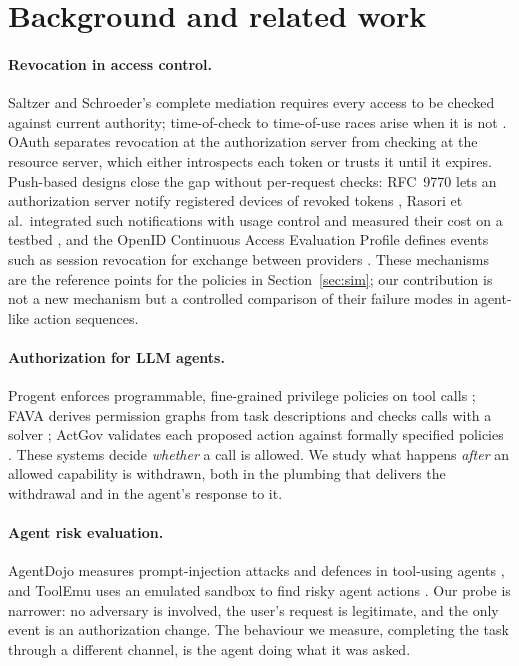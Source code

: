 \documentclass[11pt,a4paper]{article}
\begin{document}
\section{Background and related work}

\paragraph{Revocation in access control.}
Saltzer and Schroeder's complete mediation \citep{saltzer1975protection} requires every access to be checked
against current authority; time-of-check to time-of-use races arise when it is not \citep{bishop1996race}.
OAuth separates revocation at the authorization server \citep{rfc7009} from checking at the resource server,
which either introspects each token \citep{rfc7662} or trusts it until it expires. Push-based designs close the
gap without per-request checks: RFC~9770 lets an authorization server notify registered devices of revoked
tokens \citep{rfc9770}, Rasori et al.\ integrated such notifications with usage control and measured their cost on
a testbed \citep{rasori2024ace}, and the OpenID Continuous Access Evaluation Profile defines events such as
session revocation for exchange between providers \citep{caep2025}. These mechanisms are the reference points
for the policies in Section~\ref{sec:sim}; our contribution is not a new mechanism but a controlled comparison of
their failure modes in agent-like action sequences.

\paragraph{Authorization for LLM agents.}
Progent enforces programmable, fine-grained privilege policies on tool calls \citep{shi2025progent}; FAVA
derives permission graphs from task descriptions and checks calls with a solver \citep{zhang2026fava}; ActGov
validates each proposed action against formally specified policies \citep{zhang2026actgov}. These systems decide
\emph{whether} a call is allowed. We study what happens \emph{after} an allowed capability is withdrawn, both in
the plumbing that delivers the withdrawal and in the agent's response to it.

\paragraph{Agent risk evaluation.}
AgentDojo measures prompt-injection attacks and defences in tool-using agents \citep{debenedetti2024agentdojo},
and ToolEmu uses an emulated sandbox to find risky agent actions \citep{ruan2024toolemu}. Our probe is narrower:
no adversary is involved, the user's request is legitimate, and the only event is an authorization change. The
behaviour we measure, completing the task through a different channel, is the agent doing what it was asked.
\end{document}
